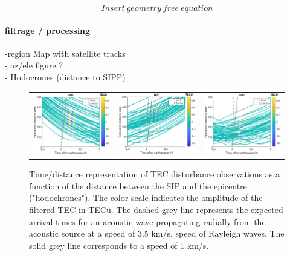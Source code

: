 \documentclass{gji}
\begin{document}
  \begin{equation}
Insert ~ geometry ~ free ~ equation
 \end{equation}
        \paragraph{filtrage / processing} 
        
        
            -region Map with satellite tracks\\
            - az/ele figure ?\\
            - Hodocrones (distance to SIPP)\\

\begin{figure}
 \begin{tabular}{l c r}
\includegraphics[width=0.3\linewidth]{images/hodocrone_G06.eps} & 
\includegraphics[width=0.3\linewidth]{images/hodocrone_G07.eps} &
\includegraphics[width=0.3\linewidth]{images/hodocrone_G30.eps}
 
\end{tabular}
\caption{ Time/distance representation of TEC disturbance observations as a function of the distance between the SIP and the epicentre ("hodochrones"). The color scale indicates the amplitude of the filtered TEC  in TECu. The dashed grey line represents the expected arrival times for an acoustic wave propagating radially from the acoustic source at a speed of 3.5 km/s, speed of Rayleigh waves. The solid grey line corresponds to a speed of 1 km/s. }
\label{Hodochrone}
\end{figure}
\end{document}
